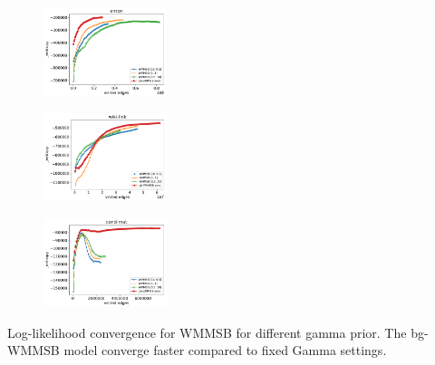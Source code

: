 
\begin{subfigure}
     \centering
         \includegraphics[width=0.32\textwidth]{warm2/enron_fig__entropy}
\end{subfigure}
\begin{subfigure}
         \centering
      \includegraphics[width=0.32\textwidth]{warm2/wiki-link_fig__entropy}
\end{subfigure}
\begin{subfigure}
         \centering
      \includegraphics[width=0.32\textwidth]{warm2/cond-mat_fig__entropy}
\end{subfigure}
\caption{Log-likelihood convergence for WMMSB for different gamma prior. The bg-WMMSB model converge faster compared to fixed Gamma settings.}
